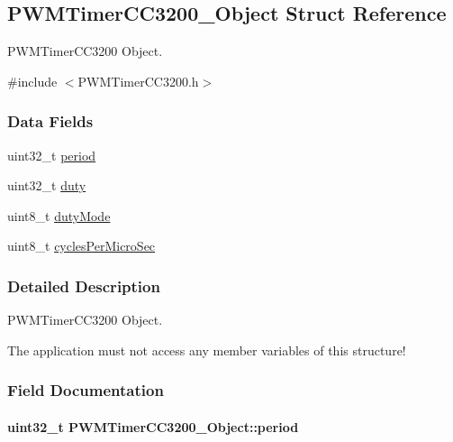 \subsection{P\+W\+M\+Timer\+C\+C3200\+\_\+\+Object Struct Reference}
\label{struct_p_w_m_timer_c_c3200___object}


P\+W\+M\+Timer\+C\+C3200 Object.  




{\ttfamily \#include $<$P\+W\+M\+Timer\+C\+C3200.\+h$>$}

\subsubsection*{Data Fields}
\begin{DoxyCompactItemize}
\item 
uint32\+\_\+t \hyperlink{struct_p_w_m_timer_c_c3200___object_aef605d284151cde91a5ea31f247c0aed}{period}
\item 
uint32\+\_\+t \hyperlink{struct_p_w_m_timer_c_c3200___object_abcda935ccb7d1926e3044fe22c742ed7}{duty}
\item 
uint8\+\_\+t \hyperlink{struct_p_w_m_timer_c_c3200___object_af1f6cc3a1691db65a6dae41451f77789}{duty\+Mode}
\item 
uint8\+\_\+t \hyperlink{struct_p_w_m_timer_c_c3200___object_adf7dc7746a99106f353aeb980b401a7d}{cycles\+Per\+Micro\+Sec}
\end{DoxyCompactItemize}


\subsubsection{Detailed Description}
P\+W\+M\+Timer\+C\+C3200 Object. 

The application must not access any member variables of this structure! 

\subsubsection{Field Documentation}
\paragraph[{period}]{\setlength{\rightskip}{0pt plus 5cm}uint32\+\_\+t P\+W\+M\+Timer\+C\+C3200\+\_\+\+Object\+::period}\label{struct_p_w_m_timer_c_c3200___object_aef605d284151cde91a5ea31f247c0aed}
